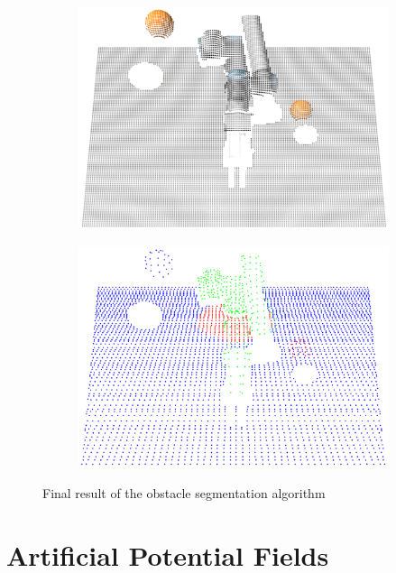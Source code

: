 \begin{figure}[h]
    \centering
    \begin{subfigure}{.5\linewidth}
      \centering
      \includegraphics[width=.95\linewidth]{figs/chp4/obstacles_before.png}
    \end{subfigure}%
    \begin{subfigure}{.5\linewidth}
      \centering
      \includegraphics[width=.95\linewidth]{figs/chp4/obstacles_after.png}
    \end{subfigure}
    \caption{Final result of the obstacle segmentation algorithm}
    \label{fig:obstacles}
\end{figure}





\section{Artificial Potential Fields}
\label{section:pf-method}

